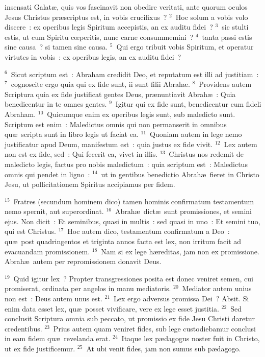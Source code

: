 \bchapter
{} insensati Galat\ae , quis vos fascinavit non obedire veritati, ante quorum oculos Jesus Christus pr\ae scriptus est, in vobis crucifixus~?
${}^{2}$~Hoc solum a vobis volo discere~: ex operibus legis Spiritum accepistis, an ex auditu fidei~?
${}^{3}$~sic stulti estis, ut cum Spiritu cœperitis, nunc carne consummemini~?
${}^{4}$~tanta passi estis sine causa~? si tamen sine causa.
${}^{5}$~Qui ergo tribuit vobis Spiritum, et operatur virtutes in vobis~: ex operibus legis, an ex auditu fidei~?


${}^{6}$~Sicut scriptum est~: Abraham credidit Deo, et reputatum est illi ad justitiam~:
${}^{7}$~cognoscite ergo quia qui ex fide sunt, ii sunt filii Abrah\ae .
${}^{8}$~Providens autem Scriptura quia ex fide justificat gentes Deus, pr\ae nuntiavit Abrah\ae~: Quia benedicentur in te omnes gentes.
${}^{9}$~Igitur qui ex fide sunt, benedicentur cum fideli Abraham.
${}^{10}$~Quicumque enim ex operibus legis sunt, sub maledicto sunt. Scriptum est enim~: Maledictus omnis qui non permanserit in omnibus qu\ae\ scripta sunt in libro legis ut faciat ea.
${}^{11}$~Quoniam autem in lege nemo justificatur apud Deum, manifestum est~: quia justus ex fide vivit.
${}^{12}$~Lex autem non est ex fide, sed~: Qui fecerit ea, vivet in illis.
${}^{13}$~Christus nos redemit de maledicto legis, factus pro nobis maledictum~: quia scriptum est~: Maledictus omnis qui pendet in ligno~:
${}^{14}$~ut in gentibus benedictio Abrah\ae\ fieret in Christo Jesu, ut pollicitationem Spiritus accipiamus per fidem.


${}^{15}$~Fratres (secundum hominem dico) tamen hominis confirmatum testamentum nemo spernit, aut superordinat.
${}^{16}$~Abrah\ae\ dict\ae\ sunt promissiones, et semini ejus. Non dicit~: Et seminibus, quasi in multis~: sed quasi in uno~: Et semini tuo, qui est Christus.
${}^{17}$~Hoc autem dico, testamentum confirmatum a Deo~: qu\ae\ post quadringentos et triginta annos facta est lex, non irritum facit ad evacuandam promissionem.
${}^{18}$~Nam si ex lege h\ae reditas, jam non ex promissione. Abrah\ae\ autem per repromissionem donavit Deus.


${}^{19}$~Quid igitur lex~? Propter transgressiones posita est donec veniret semen, cui promiserat, ordinata per angelos in manu mediatoris.
${}^{20}$~Mediator autem unius non est~: Deus autem unus est.
${}^{21}$~Lex ergo adversus promissa Dei~? Absit. Si enim data esset lex, qu\ae\ posset vivificare, vere ex lege esset justitia.
${}^{22}$~Sed conclusit Scriptura omnia sub peccato, ut promissio ex fide Jesu Christi daretur credentibus.
${}^{23}$~Prius autem quam veniret fides, sub lege custodiebamur conclusi in eam fidem qu\ae\ revelanda erat.
${}^{24}$~Itaque lex p\ae dagogus noster fuit in Christo, ut ex fide justificemur.
${}^{25}$~At ubi venit fides, jam non sumus sub p\ae dagogo.


